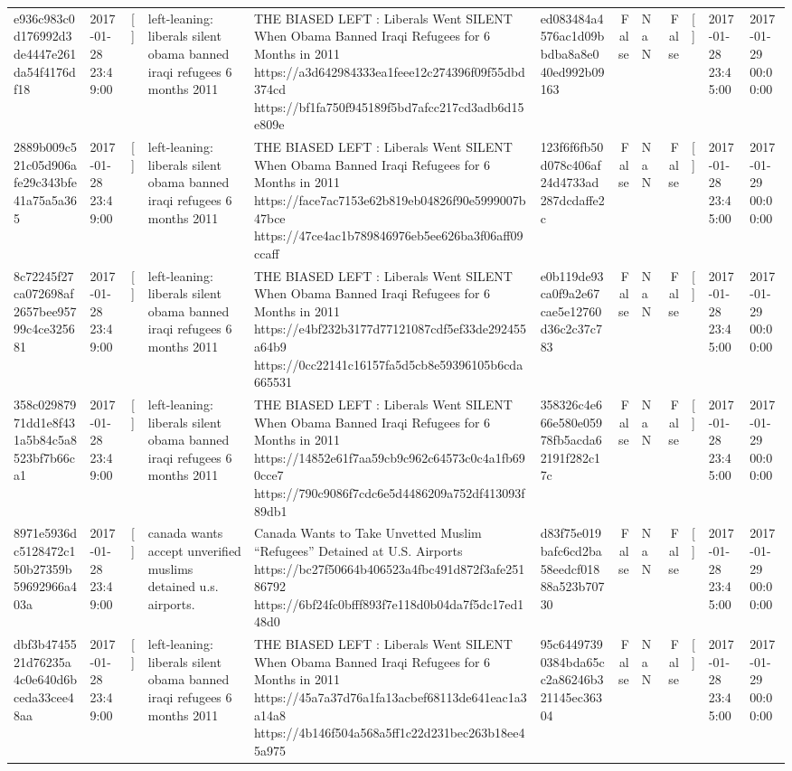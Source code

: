 \begin{tabular}{llllllrlrlll}
e936c983c0d176992d3de4447e261da54f4176df18 & 2017-01-28 23:49:00 & [] & left-leaning: liberals silent obama banned iraqi refugees 6 months 2011 & THE BIASED LEFT : Liberals Went SILENT When Obama Banned Iraqi Refugees for 6 Months in 2011 https://a3d642984333ea1feee12c274396f09f55dbd374cd https://bf1fa750f945189f5bd7afcc217cd3adb6d15e809e & ed083484a4576ac1d09bbdba8a8e040ed992b09163 & False & NaN & False & [] & 2017-01-28 23:45:00 & 2017-01-29 00:00:00 \\
2889b009c521c05d906afe29c343bfe41a75a5a365 & 2017-01-28 23:49:00 & [] & left-leaning: liberals silent obama banned iraqi refugees 6 months 2011 & THE BIASED LEFT : Liberals Went SILENT When Obama Banned Iraqi Refugees for 6 Months in 2011 https://face7ac7153e62b819eb04826f90e5999007b47bce https://47ce4ac1b789846976eb5ee626ba3f06aff09ccaff & 123f6f6fb50d078c406af24d4733ad287dcdaffe2c & False & NaN & False & [] & 2017-01-28 23:45:00 & 2017-01-29 00:00:00 \\
8c72245f27ca072698af2657bee95799c4ce325681 & 2017-01-28 23:49:00 & [] & left-leaning: liberals silent obama banned iraqi refugees 6 months 2011 & THE BIASED LEFT : Liberals Went SILENT When Obama Banned Iraqi Refugees for 6 Months in 2011 https://e4bf232b3177d77121087cdf5ef33de292455a64b9 https://0cc22141c16157fa5d5cb8e59396105b6cda665531 & e0b119de93ca0f9a2e67cae5e12760d36c2c37c783 & False & NaN & False & [] & 2017-01-28 23:45:00 & 2017-01-29 00:00:00 \\
358c02987971dd1e8f431a5b84c5a8523bf7b66ca1 & 2017-01-28 23:49:00 & [] & left-leaning: liberals silent obama banned iraqi refugees 6 months 2011 & THE BIASED LEFT : Liberals Went SILENT When Obama Banned Iraqi Refugees for 6 Months in 2011 https://14852e61f7aa59cb9c962c64573c0c4a1fb690cce7 https://790c9086f7cdc6e5d4486209a752df413093f89db1 & 358326c4e666e580e05978fb5acda62191f282c17c & False & NaN & False & [] & 2017-01-28 23:45:00 & 2017-01-29 00:00:00 \\
8971e5936dc5128472c150b27359b59692966a403a & 2017-01-28 23:49:00 & [] & canada wants accept unverified muslims detained u.s. airports. & Canada Wants to Take Unvetted Muslim “Refugees” Detained at U.S. Airports https://bc27f50664b406523a4fbc491d872f3afe25186792 https://6bf24fc0bfff893f7e118d0b04da7f5dc17ed148d0 & d83f75e019bafc6cd2ba58eedcf01888a523b70730 & False & NaN & False & [] & 2017-01-28 23:45:00 & 2017-01-29 00:00:00 \\
dbf3b4745521d76235a4c0e640d6bceda33cee48aa & 2017-01-28 23:49:00 & [] & left-leaning: liberals silent obama banned iraqi refugees 6 months 2011 & THE BIASED LEFT : Liberals Went SILENT When Obama Banned Iraqi Refugees for 6 Months in 2011 https://45a7a37d76a1fa13acbef68113de641eac1a3a14a8 https://4b146f504a568a5ff1c22d231bec263b18ee45a975 & 95c64497390384bda65cc2a86246b321145ec36304 & False & NaN & False & [] & 2017-01-28 23:45:00 & 2017-01-29 00:00:00 \\

\end{tabular}
